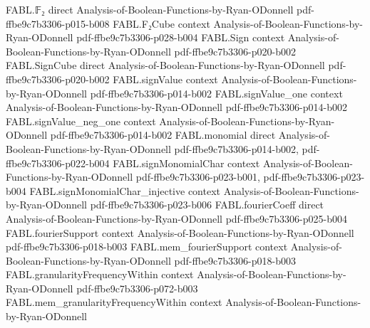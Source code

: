 \begin{theorem}
\label{FABL.allEqualStringTester_isLocalTester}
\leanok
{}
\proofstep
  {FABL.𝔽₂}
  {direct}
  {Analysis-of-Boolean-Functions-by-Ryan-ODonnell}
  {pdf-ffbe9c7b3306-p015-b008}
\proofstep
  {FABL.F₂Cube}
  {context}
  {Analysis-of-Boolean-Functions-by-Ryan-ODonnell}
  {pdf-ffbe9c7b3306-p028-b004}
\proofstep
  {FABL.Sign}
  {context}
  {Analysis-of-Boolean-Functions-by-Ryan-ODonnell}
  {pdf-ffbe9c7b3306-p020-b002}
\proofstep
  {FABL.SignCube}
  {direct}
  {Analysis-of-Boolean-Functions-by-Ryan-ODonnell}
  {pdf-ffbe9c7b3306-p020-b002}
\proofstep
  {FABL.signValue}
  {context}
  {Analysis-of-Boolean-Functions-by-Ryan-ODonnell}
  {pdf-ffbe9c7b3306-p014-b002}
\proofstep
  {FABL.signValue_one}
  {context}
  {Analysis-of-Boolean-Functions-by-Ryan-ODonnell}
  {pdf-ffbe9c7b3306-p014-b002}
\proofstep
  {FABL.signValue_neg_one}
  {context}
  {Analysis-of-Boolean-Functions-by-Ryan-ODonnell}
  {pdf-ffbe9c7b3306-p014-b002}
\proofstep
  {FABL.monomial}
  {direct}
  {Analysis-of-Boolean-Functions-by-Ryan-ODonnell}
  {pdf-ffbe9c7b3306-p014-b002,
    pdf-ffbe9c7b3306-p022-b004}
\proofstep
  {FABL.signMonomialChar}
  {context}
  {Analysis-of-Boolean-Functions-by-Ryan-ODonnell}
  {pdf-ffbe9c7b3306-p023-b001,
    pdf-ffbe9c7b3306-p023-b004}
\proofstep
  {FABL.signMonomialChar_injective}
  {context}
  {Analysis-of-Boolean-Functions-by-Ryan-ODonnell}
  {pdf-ffbe9c7b3306-p023-b006}
\proofstep
  {FABL.fourierCoeff}
  {direct}
  {Analysis-of-Boolean-Functions-by-Ryan-ODonnell}
  {pdf-ffbe9c7b3306-p025-b004}
\proofstep
  {FABL.fourierSupport}
  {context}
  {Analysis-of-Boolean-Functions-by-Ryan-ODonnell}
  {pdf-ffbe9c7b3306-p018-b003}
\proofstep
  {FABL.mem_fourierSupport}
  {context}
  {Analysis-of-Boolean-Functions-by-Ryan-ODonnell}
  {pdf-ffbe9c7b3306-p018-b003}
\proofstep
  {FABL.granularityFrequencyWithin}
  {context}
  {Analysis-of-Boolean-Functions-by-Ryan-ODonnell}
  {pdf-ffbe9c7b3306-p072-b003}
\proofstep
  {FABL.mem_granularityFrequencyWithin}
  {context}
  {Analysis-of-Boolean-Functions-by-Ryan-ODonnell}

\end{theorem}
